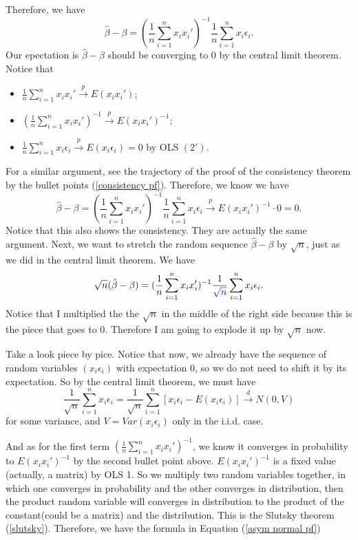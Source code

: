 \documentclass[11pt,a4paper]{amsart}
\theoremstyle{plain}
\theoremstyle{definition}
\begin{document}
 	Therefore, we have 
 	\[	 \hat{\beta} - \beta = (\frac{1}{n}\sum_{i=1}^{n} x_{i}x_{i}')^{-1} \frac{1}{n} \sum_{i=1}^{n} x_{i}\epsilon_{i}.	\]
 	Our epectation is $\hat{\beta} - \beta $ should be converging to $0$ by the central limit theorem. Notice that 
 	\begin{itemize}
 		\item $\frac{1}{n}\sum_{i=1}^{n} x_{i}x_{i}' \xrightarrow{p} E(x_{i}x_{i}')$;
 		\item $(\frac{1}{n}\sum_{i=1}^{n} x_{i}x_{i}')^{-1}  \xrightarrow{p} E(x_{i}x_{i}')^{-1}$;
 		\item $ \frac{1}{n} \sum_{i=1}^{n} x_{i}\epsilon_{i} \xrightarrow{p} E(x_{i}\epsilon_{i}) = 0$ by OLS $(2')$. 
 	\end{itemize}
 	For a similar argument, see the trajectory of the proof of the consistency theorem by the bullet points (\ref{consistency pf}). Therefore, we know we have
 	\[	 \hat{\beta} - \beta = (\frac{1}{n}\sum_{i=1}^{n} x_{i}x_{i}')^{-1} \frac{1}{n} \sum_{i=1}^{n} x_{i}\epsilon_{i} \stackrel{p}{\longrightarrow} E(x_{i}x_{i}')^{-1} \cdot 0 = 0. 	\]
 	Notice that this also shows the consistency. They are actually the same argument. Next, we want to stretch the random sequence  $ \hat{\beta} - \beta $ by $\sqrt{n}$, just as we did in the central limit theorem. We have 
 	 	\begin{equation}\label{asym normal pf}
 	 		\sqrt{n} (\hat{\beta} - \beta) = (\frac{1}{n}\sum_{i=1}^{n} x_{i}x_{i}')^{-1} \frac{1}{\textcolor{blue}{\sqrt{n}}} \sum_{i=1}^{n} x_{i}\epsilon_{i}.
 	 	\end{equation} 
 	 	Notice that I multiplied the the $\sqrt{n}$ in the middle of the right side because this is the piece that goes to $0$. Therefore I am going to explode it up by $\sqrt{n}$ now.\par 
 	 	Take a look piece by pice. Notice that now, we already have the sequence of random variables $(x_{i}\epsilon_{i})$ with expectation $0$, so we do not need to shift it by its expectation. So by the central limit theorem, we must have 
 	 	\[  \frac{1}{\sqrt{n}} \sum_{i=1}^{n} x_{i}\epsilon_{i} =  \frac{1}{\sqrt{n}} \sum_{i=1}^{n} [x_{i}\epsilon_{i}-E(x_{i}\epsilon_{i})] \stackrel{d}{\longrightarrow} N(0,V)	\]
 	 	for some variance, and $V = Var(x_{i}\epsilon_{i})$ only in the i.i.d. case.\par 
 	 	And as for the first term $(\frac{1}{n}\sum_{i=1}^{n} x_{i}x_{i}')^{-1}$, we know it converges in probability to $E(x_{i}x_{i}')^{-1}$ by the second bullet point above. $E(x_{i}x_{i}')^{-1}$ is a fixed value (actually, a matrix) by OLS 1. So we multiply two random variables together, in which one converges in probability and the other converges in distribution, then the product random variable will converges in distribution to the product of the constant(could be a matrix) and the distribution. This is the Slutsky theorem (\ref{slutsky}). Therefore, we have the formula in Equation (\ref{asym normal pf}) 
\end{document}
